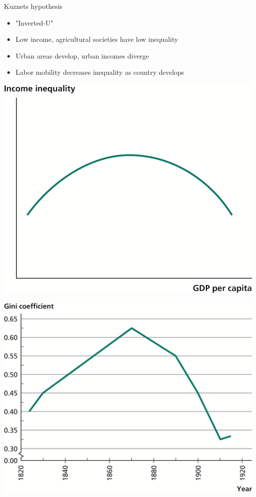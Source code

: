 \documentclass[10pt]{beamer}
\begin{document}
\begin{frame}[label={sec:org3cd4f61}]{}
\alert{Kuznets hypothesis}
\begin{itemize}
\item "Inverted-U"
\item Low income, agricultural societies have low inequality
\item Urban areas develop, urban incomes diverge
\item Labor mobility decreases inequality as country develops
\end{itemize}
\end{frame}

\begin{frame}[label={sec:org0e0ce12}]{}
\begin{center}
\includegraphics[width=.75\textwidth]{./img/13.3.png}
\end{center}
\end{frame}

\begin{frame}[label={sec:org55280e3}]{}
\begin{center}
\includegraphics[width=.75\textwidth]{./img/13.4.png}
\end{center}
\end{frame}
\end{document}
